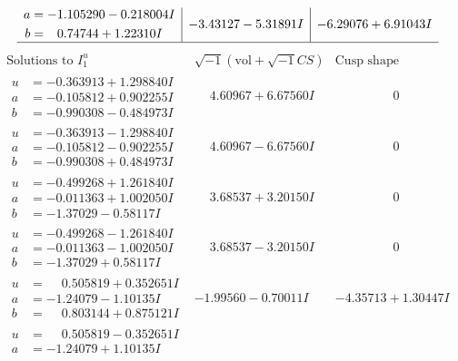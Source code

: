 \documentclass[1p]{elsarticle_modified}
\theoremstyle{definition}
\newcommand{\I}{\sqrt{-1}}
\begin{document}
$$\begin{array}{c|c|c}
\begin{aligned}
a &= -1.105290 - 0.218004 I \\
b &= \phantom{-}0.74744 + 1.22310 I\end{aligned}
 & -3.43127 - 5.31891 I & -6.29076 + 6.91043 I\\
 \hline 
 \end{array}$$\newpage$$\begin{array}{c|c|c}  
\text{Solutions to }I^u_{1}& \I (\text{vol} + \sqrt{-1}CS) & \text{Cusp shape}\\
 \hline 
\begin{aligned}
u &= -0.363913 + 1.298840 I \\
a &= -0.105812 + 0.902255 I \\
b &= -0.990308 - 0.484973 I\end{aligned}
 & \phantom{-}4.60967 + 6.67560 I & \phantom{-0.000000 } 0 \\ \hline\begin{aligned}
u &= -0.363913 - 1.298840 I \\
a &= -0.105812 - 0.902255 I \\
b &= -0.990308 + 0.484973 I\end{aligned}
 & \phantom{-}4.60967 - 6.67560 I & \phantom{-0.000000 } 0 \\ \hline\begin{aligned}
u &= -0.499268 + 1.261840 I \\
a &= -0.011363 + 1.002050 I \\
b &= -1.37029 - 0.58117 I\end{aligned}
 & \phantom{-}3.68537 + 3.20150 I & \phantom{-0.000000 } 0 \\ \hline\begin{aligned}
u &= -0.499268 - 1.261840 I \\
a &= -0.011363 - 1.002050 I \\
b &= -1.37029 + 0.58117 I\end{aligned}
 & \phantom{-}3.68537 - 3.20150 I & \phantom{-0.000000 } 0 \\ \hline\begin{aligned}
u &= \phantom{-}0.505819 + 0.352651 I \\
a &= -1.24079 - 1.10135 I \\
b &= \phantom{-}0.803144 + 0.875121 I\end{aligned}
 & -1.99560 - 0.70011 I & -4.35713 + 1.30447 I \\ \hline\begin{aligned}
u &= \phantom{-}0.505819 - 0.352651 I \\
a &= -1.24079 + 1.10135 I \\

\end{aligned}
\end{array}$$
\end{document}
